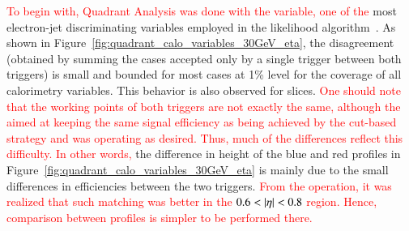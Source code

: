 
\textcolor{red}{To begin with, Quadrant Analysis was done with the \reta{} variable, one of the} 
most electron-jet discriminating variables employed in the likelihood
algorithm~\cite{aaboud2019electron}. As shown in Figure~\ref{fig:quadrant_calo_variables_30GeV_eta}, the disagreement (obtained by summing the cases accepted only by a single trigger between both triggers) is small and bounded for most cases at 1\% level for the coverage of all calorimetry variables. 
This behavior is also observed for \et{} slices. 
\textcolor{red}{One should note that the working points of both triggers are not  exactly the same, although the \rnn{} aimed at keeping the same signal efficiency as being achieved by the cut-based strategy and was operating as desired.  Thus, much of the differences reflect this difficulty. In other words, }
the difference in height of the blue and red profiles in Figure~\ref{fig:quadrant_calo_variables_30GeV_eta} is mainly due to the small differences in efficiencies between the two triggers.
\textcolor{red}{From the operation, it was realized that such matching was better in the $0.6<\abseta{}<0.8$ region. Hence, comparison between profiles is simpler to be performed there.}

